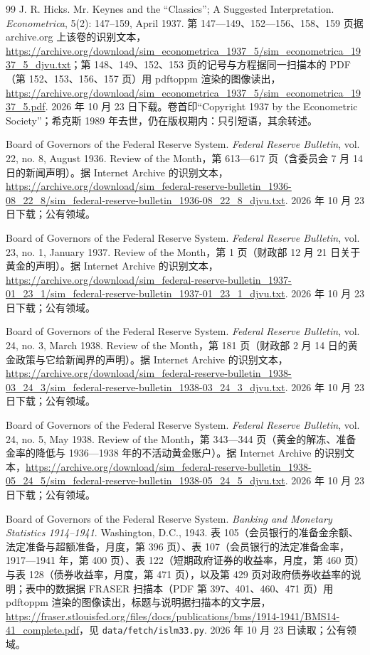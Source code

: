 \begin{thebibliography}{99}
 J. R. Hicks. Mr. Keynes and the ``Classics''; A Suggested Interpretation. \emph{Econometrica}, 5(2): 147--159, April 1937. 第 147—149、152—156、158、159 页据 archive.org 上该卷的识别文本，\url{https://archive.org/download/sim_econometrica_1937_5/sim_econometrica_1937_5_djvu.txt}；第 148、149、152、153 页的记号与方程据同一扫描本的 PDF（第 152、153、156、157 页）用 pdftoppm 渲染的图像读出，\url{https://archive.org/download/sim_econometrica_1937_5/sim_econometrica_1937_5.pdf}. 2026 年 10 月 23 日下载。卷首印“Copyright 1937 by the Econometric Society”；希克斯 1989 年去世，仍在版权期内：只引短语，其余转述。

 Board of Governors of the Federal Reserve System. \emph{Federal Reserve Bulletin}, vol. 22, no. 8, August 1936. Review of the Month，第 613—617 页（含委员会 7 月 14 日的新闻声明）。据 Internet Archive 的识别文本，\url{https://archive.org/download/sim_federal-reserve-bulletin_1936-08_22_8/sim_federal-reserve-bulletin_1936-08_22_8_djvu.txt}. 2026 年 10 月 23 日下载；公有领域。

 Board of Governors of the Federal Reserve System. \emph{Federal Reserve Bulletin}, vol. 23, no. 1, January 1937. Review of the Month，第 1 页（财政部 12 月 21 日关于黄金的声明）。据 Internet Archive 的识别文本，\url{https://archive.org/download/sim_federal-reserve-bulletin_1937-01_23_1/sim_federal-reserve-bulletin_1937-01_23_1_djvu.txt}. 2026 年 10 月 23 日下载；公有领域。

 Board of Governors of the Federal Reserve System. \emph{Federal Reserve Bulletin}, vol. 24, no. 3, March 1938. Review of the Month，第 181 页（财政部 2 月 14 日的黄金政策与它给新闻界的声明）。据 Internet Archive 的识别文本，\url{https://archive.org/download/sim_federal-reserve-bulletin_1938-03_24_3/sim_federal-reserve-bulletin_1938-03_24_3_djvu.txt}. 2026 年 10 月 23 日下载；公有领域。

 Board of Governors of the Federal Reserve System. \emph{Federal Reserve Bulletin}, vol. 24, no. 5, May 1938. Review of the Month，第 343—344 页（黄金的解冻、准备金率的降低与 1936—1938 年的不活动黄金账户）。据 Internet Archive 的识别文本，\url{https://archive.org/download/sim_federal-reserve-bulletin_1938-05_24_5/sim_federal-reserve-bulletin_1938-05_24_5_djvu.txt}. 2026 年 10 月 23 日下载；公有领域。

 Board of Governors of the Federal Reserve System. \emph{Banking and Monetary Statistics 1914--1941}. Washington, D.C., 1943. 表 105（会员银行的准备金余额、法定准备与超额准备，月度，第 396 页）、表 107（会员银行的法定准备金率，1917—1941 年，第 400 页）、表 122（短期政府证券的收益率，月度，第 460 页）与表 128（债券收益率，月度，第 471 页），以及第 429 页对政府债券收益率的说明；表中的数据据 FRASER 扫描本（PDF 第 397、401、460、471 页）用 pdftoppm 渲染的图像读出，标题与说明据扫描本的文字层，\url{https://fraser.stlouisfed.org/files/docs/publications/bms/1914-1941/BMS14-41_complete.pdf}，见 \texttt{data/fetch/islm33.py}. 2026 年 10 月 23 日读取；公有领域。


\end{thebibliography}
